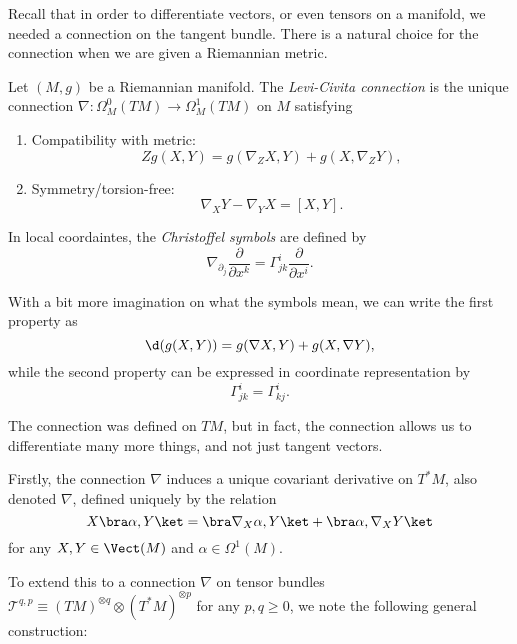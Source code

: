 \documentclass[a4paper]{article}
\begin{document}
Recall that in order to differentiate vectors, or even tensors on a manifold, we needed a connection on the tangent bundle. There is a natural choice for the connection when we are given a Riemannian metric.
\begin{defi}
  Let $(M, g)$ be a Riemannian manifold. The \emph{Levi-Civita connection} is the unique connection $\nabla: \Omega^0_M(TM) \to \Omega^1_M(TM)$ on $M$ satisfying
  \begin{enumerate}
    \item Compatibility with metric:
      \[
        Z g(X, Y) = g(\nabla_Z X, Y) + g(X, \nabla_Z Y),
      \]
    \item Symmetry/torsion-free:
      \[
        \nabla_X Y - \nabla_Y X = [X, Y].
      \]
  \end{enumerate}
\end{defi}

\begin{defi}
  In local coordaintes, the \emph{Christoffel symbols} are defined by
  \[
    \nabla_{\partial_j} \frac{\partial}{\partial x^k} = \Gamma_{jk}^i \frac{\partial}{\partial x^i}.
  \]
\end{defi}

With a bit more imagination on what the symbols mean, we can write the first property as
\[
  \d (g(X, Y)) = g(\nabla X, Y) + g(X, \nabla Y),
\]
while the second property can be expressed in coordinate representation by
\[
  \Gamma_{jk}^i = \Gamma_{kj}^i.
\]

The connection was defined on $TM$, but in fact, the connection allows us to differentiate many more things, and not just tangent vectors.

Firstly, the connection $\nabla$ induces a unique covariant derivative on $T^*M$, also denoted $\nabla$, defined uniquely by the relation
\[
  X\bra \alpha, Y\ket = \bra \nabla_X \alpha , Y\ket + \bra \alpha, \nabla_X Y\ket
\]
for any $X,Y \in \Vect(M)$ and $\alpha \in \Omega^1(M)$.

To extend this to a connection $\nabla$ on tensor bundles $\mathcal{T}^{q, p} \equiv (TM)^{\otimes q} \otimes (T^*M)^{\otimes p}$ for any $p, q \geq 0$, we note the following general construction:
\end{document}
